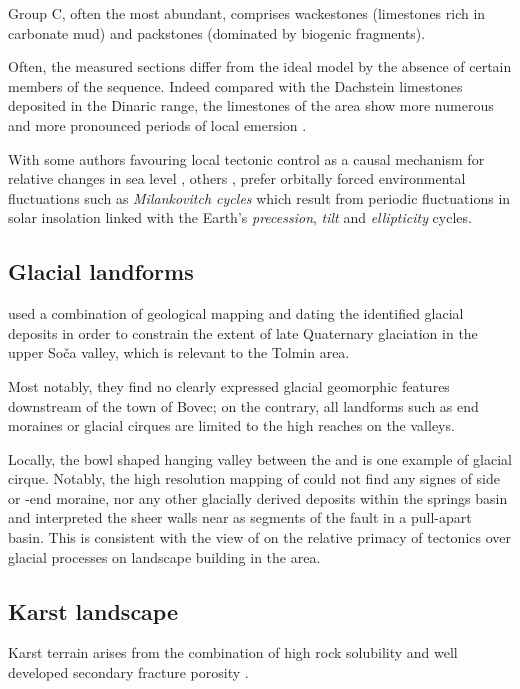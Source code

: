 Group C, often the most abundant, comprises wackestones (limestones rich in carbonate mud) and packstones (dominated by biogenic fragments).

Often, the measured sections differ from the ideal model by the absence of certain members of the sequence. Indeed compared with the Dachstein limestones deposited in the Dinaric range, the limestones of the  area show more numerous and more pronounced periods of local emersion \citep{ogorelec1996dachstein}.

 With some authors favouring local tectonic control as a causal mechanism  for relative changes in sea level \citep{goldhammer1990depositional,enos1998lofer}, others \citep{fisher1964lofer,balog1997shallow,haas2004characteristics,doi:10.1130/G21578.1}, prefer orbitally forced environmental fluctuations such as \emph{Milankovitch cycles} which result from periodic fluctuations in solar insolation linked with the Earth's \emph{precession}, \emph{tilt} and \emph{ellipticity} cycles. 

 \subsection{Glacial landforms}
 \citet{bavec2004late} used a combination of geological mapping and dating the identified glacial deposits in order to constrain the extent of late Quaternary glaciation in the upper So\v{c}a valley, which is relevant to the Tolmin area.

 Most notably, they find no clearly expressed glacial geomorphic features downstream of the town of Bovec; on the contrary, all landforms such as end moraines or glacial cirques are limited to the high reaches on the valleys. 

Locally, the bowl shaped hanging valley between the  and  is one example of glacial cirque. Notably, the high resolution mapping of \citet{cunningham2006application} could not find any signes of side or -end moraine, nor any other glacially derived deposits within the  springs basin and interpreted the sheer walls near  as segments of the  fault in a pull-apart basin. 
This is consistent with the view of \citet{vsmuc2009tectonic} on the relative primacy of tectonics over glacial processes on landscape building in the  area.

 \subsection{Karst landscape}
Karst terrain arises from the combination of high rock solubility and well developed secondary fracture porosity \citep{ford2013karst}. 

